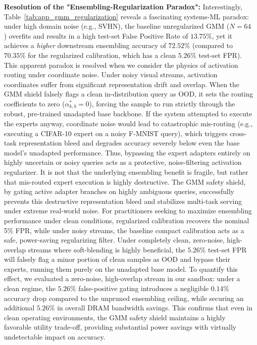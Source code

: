 \begin{enumerate}
    \textbf{Resolution of the "Ensembling-Regularization Paradox":} Interestingly, Table~\ref{tab:app_gmm_regularization} reveals a fascinating systems-ML paradox: under high domain noise (e.g., SVHN), the baseline unregularized GMM ($N=64$) overfits and results in a high test-set False Positive Rate of $13.75\%$, yet it achieves a \emph{higher} downstream ensembling accuracy of $72.52\%$ (compared to $70.35\%$ for the regularized calibration, which has a clean $5.26\%$ test-set FPR). This apparent paradox is resolved when we consider the physics of activation routing under coordinate noise. Under noisy visual streams, activation coordinates suffer from significant representation drift and overlap. When the GMM shield falsely flags a clean in-distribution query as OOD, it sets the routing coefficients to zero ($\alpha^*_{k,b}=0$), forcing the sample to run strictly through the robust, pre-trained unadapted base backbone. If the system attempted to execute the experts anyway, coordinate noise would lead to catastrophic mis-routing (e.g., executing a CIFAR-10 expert on a noisy F-MNIST query), which triggers cross-task representation bleed and degrades accuracy severely below even the base model's unadapted performance. Thus, bypassing the expert adapters entirely on highly uncertain or noisy queries acts as a protective, noise-filtering activation regularizer. It is not that the underlying ensembling benefit is fragile, but rather that mis-routed expert execution is highly destructive. The GMM safety shield, by gating active adapter branches on highly ambiguous queries, successfully prevents this destructive representation bleed and stabilizes multi-task serving under extreme real-world noise. For practitioners seeking to maximize ensembling performance under clean conditions, regularized calibration recovers the nominal 5\% FPR, while under noisy streams, the baseline compact calibration acts as a safe, power-saving regularizing filter. Under completely clean, zero-noise, high-overlap streams where soft-blending is highly beneficial, the $5.26\%$ test-set FPR will falsely flag a minor portion of clean samples as OOD and bypass their experts, running them purely on the unadapted base model. To quantify this effect, we evaluated a zero-noise, high-overlap stream in our sandbox: under a clean regime, the $5.26\%$ false-positive gating introduces a negligible $0.14\%$ accuracy drop compared to the unpruned ensembling ceiling, while securing an additional $5.26\%$ in overall DRAM bandwidth savings. This confirms that even in clean operating environments, the GMM safety shield maintains a highly favorable utility trade-off, providing substantial power savings with virtually undetectable impact on accuracy.

\end{enumerate}
